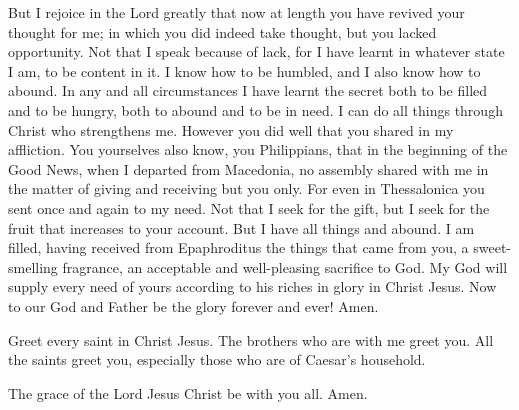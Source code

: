  But I rejoice in the Lord greatly that now at length you
have revived your thought for me; in which you did indeed take thought,
but you lacked opportunity.  Not that I speak because of
lack, for I have learnt in whatever state I am, to be content in it.
 I know how to be humbled, and I also know how to abound.
In any and all circumstances I have learnt the secret both to be filled
and to be hungry, both to abound and to be in need.  I
can do all things through Christ who strengthens me. 
However you did well that you shared in my affliction. 
You yourselves also know, you Philippians, that in the beginning of the
Good News, when I departed from Macedonia, no assembly shared with me in
the matter of giving and receiving but you only.  For
even in Thessalonica you sent once and again to my need. 
Not that I seek for the gift, but I seek for the fruit that increases to
your account.  But I have all things and abound. I am
filled, having received from Epaphroditus the things that came from you,
a sweet-smelling fragrance, an acceptable and well-pleasing sacrifice to
God.  My God will supply every need of yours according to
his riches in glory in Christ Jesus.  Now to our God and
Father be the glory forever and ever! Amen.

 Greet every saint in Christ Jesus. The brothers who are
with me greet you.  All the saints greet you, especially
those who are of Caesar's household.

 The grace of the Lord Jesus Christ be with you all.
Amen.
